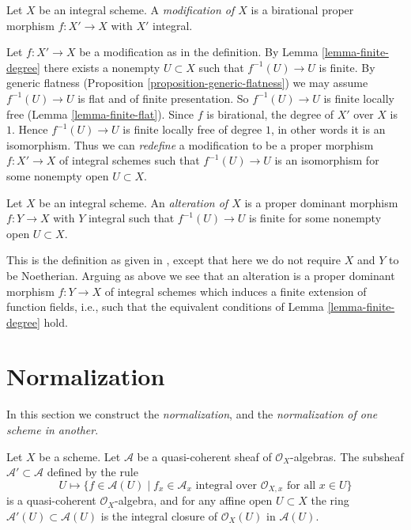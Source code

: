 \begin{definition}
\label{definition-modification}
Let $X$ be an integral scheme. A {\it modification of $X$}
is a birational proper morphism $f : X' \to X$ with $X'$
integral.
\end{definition}

\noindent
Let $f : X' \to X$ be a modification as in the definition. By
Lemma \ref{lemma-finite-degree} there exists a nonempty $U \subset X$ such
that $f^{-1}(U) \to U$ is finite. By generic flatness
(Proposition \ref{proposition-generic-flatness})
we may assume $f^{-1}(U) \to U$ is flat and of finite presentation.
So $f^{-1}(U) \to U$ is finite locally free (Lemma \ref{lemma-finite-flat}).
Since $f$ is birational, the degree of $X'$ over $X$ is $1$.
Hence $f^{-1}(U) \to U$ is finite locally free of degree $1$,
in other words it is an isomorphism. Thus we can {\it redefine} a
modification to be a proper morphism $f : X' \to X$ of integral schemes
such that $f^{-1}(U) \to U$ is an isomorphism for some nonempty open
$U \subset X$.

\begin{definition}
\label{definition-alteration}
\begin{reference}
\cite[Definition 2.20]{alterations}
\end{reference}
Let $X$ be an integral scheme. An {\it alteration of $X$}
is a proper dominant morphism $f : Y \to X$ with $Y$ integral such
that $f^{-1}(U) \to U$ is finite for some nonempty open $U \subset X$.
\end{definition}

\noindent
This is the definition as given in \cite{alterations}, except that
here we do not require $X$ and $Y$ to be Noetherian. Arguing as above
we see that an alteration is a proper dominant morphism $f : Y \to X$
of integral schemes which induces a finite extension of
function fields, i.e., such that the equivalent conditions of
Lemma \ref{lemma-finite-degree} hold.







\section{Normalization}
\label{section-normalization}

\noindent
In this section we construct the {\it normalization}, and the
{\it normalization of one scheme in another}.

\begin{lemma}
\label{lemma-integral-closure}
Let $X$ be a scheme. Let $\mathcal{A}$ be a quasi-coherent sheaf
of $\mathcal{O}_X$-algebras. The subsheaf $\mathcal{A}' \subset \mathcal{A}$
defined by the rule
$$
U \longmapsto \{f \in \mathcal{A}(U) \mid
f_x \in \mathcal{A}_x \text{ integral over } \mathcal{O}_{X, x}
\text{ for all }x \in U\}
$$
is a quasi-coherent $\mathcal{O}_X$-algebra, and for any affine open
$U \subset X$ the ring $\mathcal{A}'(U) \subset \mathcal{A}(U)$ is
the integral closure of $\mathcal{O}_X(U)$ in $\mathcal{A}(U)$.
\end{lemma}

